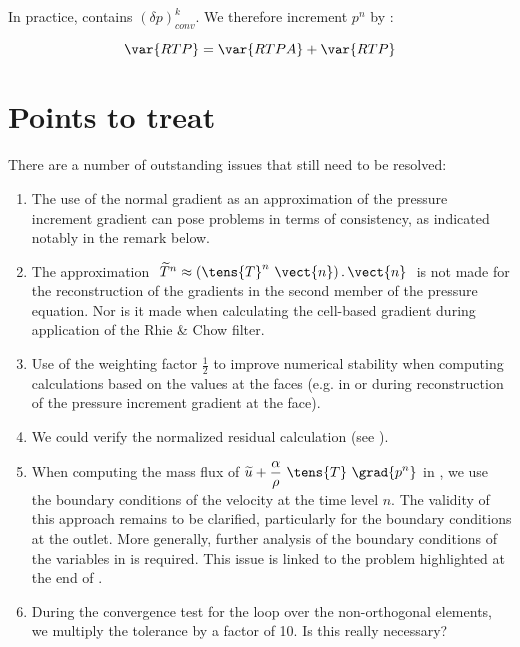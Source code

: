 In practice,  contains $(\delta p)^k_{conv}$. We therefore increment $p^n$ by :

$$\var{RTP} = \var{RTPA} + \var{RTP} $$

\clearpage

\section*{Points to treat}
There are a number of outstanding issues that still need to be resolved:
\begin{enumerate}

\item The use of the normal gradient as an approximation of the pressure increment gradient can pose problems in terms of consistency, as indicated notably in the remark below.

\item The approximation $\ \widetilde{T}^n \approx (\tens{T}^n \ \vect{n})\,.\,\vect{n}\ $ is not made for the reconstruction of the gradients in the second member of the pressure equation. Nor is it made when calculating the cell-based gradient during application of the Rhie \& Chow filter.

\item Use of the weighting factor $\displaystyle \frac {1}{2}$ to improve numerical stability when computing calculations based on the values at the faces  (e.g. in  or  during reconstruction of the pressure increment gradient at the face).

\item We could verify the normalized residual calculation (see ).

\item When computing the mass flux of $\displaystyle \widetilde{u}+
\frac{\alpha}{\rho}\ \tens{T}\ \grad{p^n}$ in , we use the boundary conditions of the velocity at the time level $n$. The validity of this approach remains to be clarified, particularly for the
boundary conditions at the outlet. More generally, further analysis of the boundary conditions of the variables in
 is required. This issue is linked to the problem highlighted at the end of .

\item During the convergence test for the loop over the non-orthogonal elements, we multiply the tolerance by a factor of 10. Is this really necessary?


\end{enumerate}

